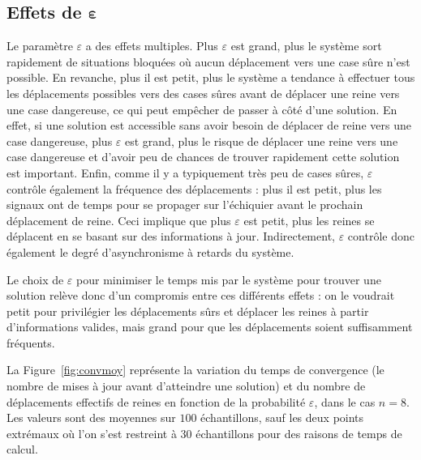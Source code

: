 \subsection{Effets de $\boldsymbol \varepsilon$}



Le paramètre $\varepsilon$ a des effets multiples. Plus $\varepsilon$ est grand, plus le système sort rapidement de situations bloquées où aucun déplacement vers une case sûre n'est possible. En revanche, plus il est petit, plus le système a tendance à effectuer tous les déplacements possibles vers des cases sûres avant de déplacer une reine vers une case dangereuse, ce qui peut empêcher de passer à côté d'une solution. En effet, si une solution est accessible sans avoir besoin de déplacer de reine vers une case dangereuse, plus $\varepsilon$ est grand, plus le risque de déplacer une reine vers une case dangereuse et d'avoir peu de chances de trouver rapidement cette solution est important. Enfin, comme il y a typiquement très peu de cases sûres, $\varepsilon$ contrôle également la fréquence des déplacements : plus il est petit, plus les signaux ont de temps pour se propager sur l'échiquier avant le prochain déplacement de reine. Ceci implique que plus $\varepsilon$ est petit, plus les reines se déplacent en se basant sur des informations à jour. Indirectement, $\varepsilon$ contrôle donc également le degré d'asynchronisme à retards du système. 

Le choix de $\varepsilon$ pour minimiser le temps mis par le système pour trouver une solution relève donc d'un compromis entre ces différents effets : on le voudrait petit pour privilégier les déplacements sûrs et déplacer les reines à partir d'informations valides, mais grand pour que les déplacements soient suffisamment fréquents.

La Figure~\ref{fig:convmoy} représente la variation du temps de convergence (le nombre de mises à jour avant d'atteindre une solution) et du nombre de déplacements effectifs de reines en fonction de la probabilité $\varepsilon$, dans le cas $n=8$. Les valeurs sont des moyennes sur $100$ échantillons, sauf les deux points extrémaux où l'on s'est restreint à $30$ échantillons pour des raisons de temps de calcul. 


